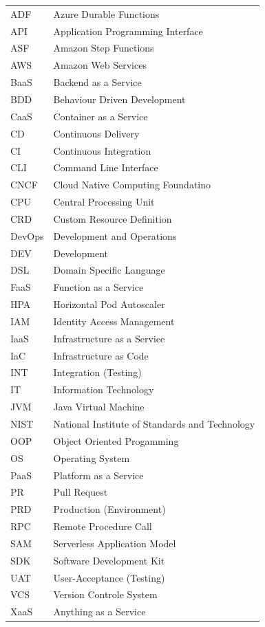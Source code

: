 \documentclass[11pt]{article}
\begin{document}
\begin{tabular}{ p{2cm} p{10cm}} 
ADF & Azure Durable Functions \\
API & Application Programming Interface \\
ASF & Amazon Step Functions \\
AWS & Amazon Web Services \\
BaaS & Backend as a Service \\
BDD & Behaviour Driven Development \\
CaaS & Container as a Service \\  
CD & Continuous Delivery \\  
CI & Continuous Integration \\
CLI & Command Line Interface \\
CNCF & Cloud Native Computing Foundatino \\
CPU & Central Processing Unit \\
CRD & Custom Resource Definition \\
DevOps & Development and Operations \\  
DEV & Development \\
DSL & Domain Specific Language \\
FaaS & Function as a Service \\ 
HPA & Horizontal Pod Autoscaler \\
IAM & Identity Access Management \\
IaaS & Infrastructure as a Service \\
IaC & Infrastructure as Code \\
INT & Integration (Testing) \\
IT & Information Technology \\
JVM & Java Virtual Machine \\
NIST & National Institute of Standards and Technology \\
OOP & Object Oriented Progamming \\
OS & Operating System \\
PaaS & Platform as a Service \\
PR & Pull Request \\
PRD & Production (Environment) \\
RPC & Remote Procedure Call \\
SAM & Serverless Application Model \\
SDK & Software Development Kit \\
UAT & User-Acceptance (Testing) \\
VCS & Version Controle System \\
XaaS & Anything as a Service \\
\end{tabular}
\newpage
\tableofcontents
\newpage
\end{document}
